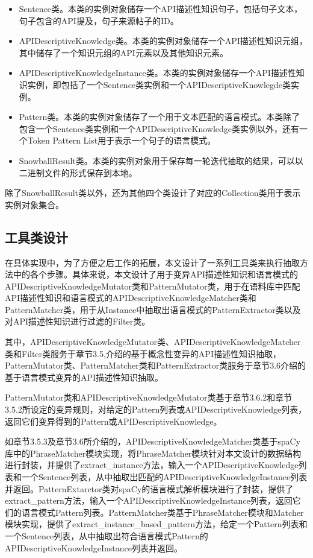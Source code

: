 \begin{itemize}
    \item Sentence类。本类的实例对象储存一个API描述性知识句子，包括句子文本，句子包含的API提及，句子来源帖子的ID。
    \item APIDescriptiveKnowledge类。本类的实例对象储存一个API描述性知识元组，其中储存了一个知识元组的API元素以及其他知识元素。
    \item APIDescriptiveKnowledgeInstance类。本类的实例对象储存一个API描述性知识实例，即包括了一个Sentence类实例和一个APIDescriptiveKnowlegde类实例。
    \item Pattern类。本类的实例对象储存了一个用于文本匹配的语言模式。本类除了包含一个Sentence类实例和一个APIDescriptiveKnowledge类实例以外，还有一个Token Pattern List用于表示一个句子的语言模式。
    \item SnowballResult类。本类的实例对象用于保存每一轮迭代抽取的结果，可以以二进制文件的形式保存到本地。
\end{itemize}

除了SnowballResult类以外，还为其他四个类设计了对应的Collection类用于表示实例对象集合。

\subsection{工具类设计}
在具体实现中，为了方便之后工作的拓展，本文设计了一系列工具类来执行抽取方法中的各个步骤。具体来说，本文设计了用于变异API描述性知识和语言模式的APIDescriptiveKnowledgeMutator类和PatternMutator类，用于在语料库中匹配API描述性知识和语言模式的APIDescriptiveKnowledgeMatcher类和PatternMatcher类，用于从Instance中抽取出语言模式的PatternExtractor类以及对API描述性知识进行过滤的Filter类。

其中，APIDescriptiveKnowledgeMutator类、APIDescriptiveKnowledgeMatcher类和Filter类服务于章节3.5,介绍的基于概念性变异的API描述性知识抽取，PatternMutator类、PatternMatcher类和PatternExtractor类服务于章节3.6介绍的基于语言模式变异的API描述性知识抽取。

PatternMutator类和APIDescriptiveKnowledgeMutator类基于章节3.6.2和章节3.5.2所设定的变异规则，对给定的Pattern列表或APIDescriptiveKnowledge列表，返回它们变异得到的Pattern或APIDescriptiveKnowledge。

如章节3.5.3及章节3.6所介绍的，APIDescriptiveKnowledgeMatcher类基于spaCy库中的PhraseMatcher模块实现，将PhraseMatcher模块针对本文设计的数据结构进行封装，并提供了extract\_instance方法，输入一个APIDescriptiveKnowledge列表和一个Sentence列表，从中抽取出匹配的APIDescriptiveKnowledgeInstance列表并返回。PatternExtarctor类对spaCy的语言模式解析模块进行了封装，提供了extract\_pattern方法，输入一个APIDescriptiveKnowledgeInstance列表，返回它们的语言模式Pattern列表。PatternMatcher类基于PhraseMatcher模块和Matcher模块实现，提供了extract\_instance\_based\_pattern方法，给定一个Pattern列表和一个Sentence列表，从中抽取出符合语言模式Pattern的APIDescriptiveKnowledgeInstance列表并返回。

